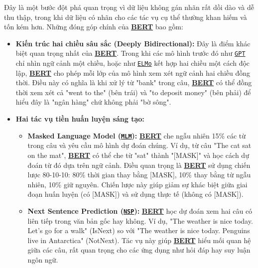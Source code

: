 Đây là một bước đột phá quan trọng vì dữ liệu không gán nhãn rất dồi dào và dễ thu thập, trong khi dữ liệu có nhãn cho các tác vụ cụ thể thường khan hiếm và tốn kém hơn.
Những đóng góp chính của \hyperref[acro:bert]{\textbf{BERT}} bao gồm:
\begin{itemize}
    \item \textbf{Kiến trúc hai chiều sâu sắc (Deeply Bidirectional):} Đây là điểm khác biệt quan trọng nhất của \hyperref[acro:bert]{\textbf{BERT}}.
    Trong khi các mô hình trước đó như \hyperref[acro:gpt]{\texttt{GPT}} \cite{radford2018improving} chỉ nhìn ngữ cảnh một chiều, hoặc như \hyperref[acro:elmo]{\texttt{ELMo}} \cite{peters2018deep} kết hợp hai chiều một cách độc lập, \hyperref[acro:bert]{\textbf{BERT}} cho phép mỗi lớp của mô hình xem xét ngữ cảnh hai chiều đồng thời.
    Điều này có nghĩa là khi xử lý từ "bank" trong câu, \hyperref[acro:bert]{\textbf{BERT}} có thể đồng thời xem xét cả "went to the" (bên trái) và "to deposit money" (bên phải) để hiểu đây là "ngân hàng" chứ không phải "bờ sông".
    \item \textbf{Hai tác vụ tiền huấn luyện sáng tạo:}
    \begin{itemize}
        \item \textbf{Masked Language Model (\hyperref[acro:mlm]{\texttt{MLM}}):} \hyperref[acro:bert]{\textbf{BERT}} che ngẫu nhiên 15\% các từ trong câu và yêu cầu mô hình dự đoán chúng.
        Ví dụ, từ câu "The cat sat on the mat", \hyperref[acro:bert]{\textbf{BERT}} có thể che từ "sat" thành "[MASK]" và học cách dự đoán từ đó dựa trên ngữ cảnh.
        Điều quan trọng là \hyperref[acro:bert]{\textbf{BERT}} sử dụng chiến lược 80-10-10: 80\% thời gian thay bằng [MASK], 10\% thay bằng từ ngẫu nhiên, 10\% giữ nguyên.
        Chiến lược này giúp giảm sự khác biệt giữa giai đoạn huấn luyện (có [MASK]) và sử dụng thực tế (không có [MASK]).
        \item \textbf{Next Sentence Prediction (\hyperref[acro:nsp]{\texttt{NSP}}):} \hyperref[acro:bert]{\textbf{BERT}} học dự đoán xem hai câu có liên tiếp trong văn bản gốc hay không.
        Ví dụ, "The weather is nice today. Let's go for a walk" (IsNext) so với "The weather is nice today. Penguins live in Antarctica" (NotNext).
        Tác vụ này giúp \hyperref[acro:bert]{\textbf{BERT}} hiểu mối quan hệ giữa các câu, rất quan trọng cho các ứng dụng như hỏi đáp hay suy luận ngôn ngữ.
    \end{itemize}
    

\end{itemize}
